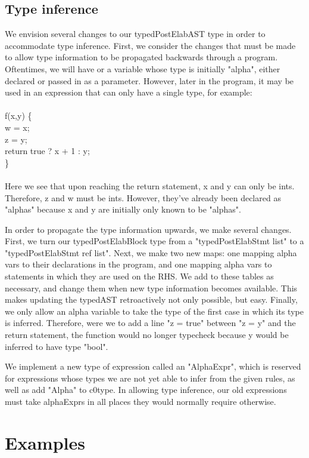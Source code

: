 \documentclass{article}
\begin{document}
\subsection{Type inference}
We envision several changes to our typedPostElabAST type in order to accommodate type inference. First, we consider the changes that must be made to allow type information to be propagated backwards through a program. Oftentimes, we will have or a variable whose type is initially "alpha", either declared or passed in as a parameter. However, later in the program, it may be used in an expression that can only have a single type, for example:\\
\\
f(x,y) \{\\
  w = x;\\
  z = y;\\
  return true ? x + 1 : y; \\
\} \\
\\
Here we see that upon reaching the return statement, x and y can only be ints. Therefore, z and w must be ints. However, they've already been declared as "alphas" because x and y are initially only known to be "alphas". 

In order to propagate the type information upwards, we make several changes. First, we turn our typedPostElabBlock type from a "typedPostElabStmt list" to a "typedPostElabStmt ref list". Next, we make two new maps: one mapping alpha vars to their declarations in the program, and one mapping alpha vars to statements in which they are used on the RHS. We add to these tables as necessary, and change them when new type information becomes available. This makes updating the typedAST retroactively not only possible, but easy. Finally, we only allow an alpha variable to take the type of the first case in which its type is inferred. Therefore, were we to add a line "z = true" between "z = y" and the return statement, the function would no longer typecheck because y would be inferred to have type "bool".

We implement a new type of expression called an "AlphaExpr", which is reserved for expressions whose types we are not yet able to infer from the given rules, as well as add "Alpha" to c0type. In allowing type inference, our old expressions must take alphaExprs in all places they would normally require otherwise. 

\section{Examples}
\end{document}
